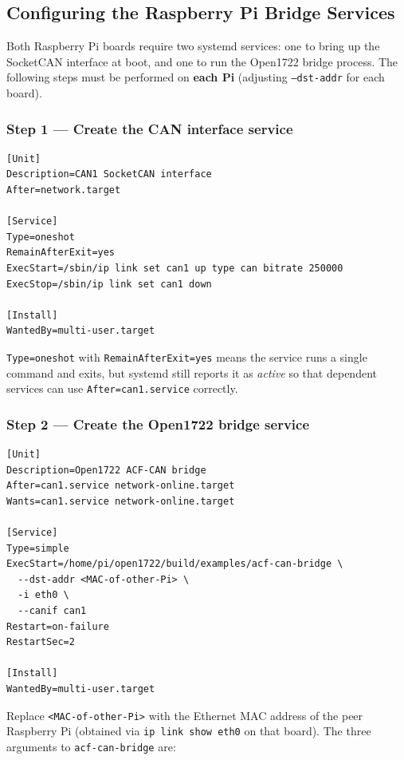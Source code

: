\documentclass[11pt,a4paper]{article}
\begin{document}
\subsection{Configuring the Raspberry Pi Bridge Services}
\label{sec:rpi_setup}

Both Raspberry Pi boards require two systemd services: one to bring up the SocketCAN
interface at boot, and one to run the Open1722 bridge process.  The following steps
must be performed on \textbf{each Pi} (adjusting \texttt{--dst-addr} for each board).

\subsubsection*{Step 1 --- Create the CAN interface service}

\begin{lstlisting}[caption={/etc/systemd/system/can1.service}]
[Unit]
Description=CAN1 SocketCAN interface
After=network.target

[Service]
Type=oneshot
RemainAfterExit=yes
ExecStart=/sbin/ip link set can1 up type can bitrate 250000
ExecStop=/sbin/ip link set can1 down

[Install]
WantedBy=multi-user.target
\end{lstlisting}

\texttt{Type=oneshot} with \texttt{RemainAfterExit=yes} means the service runs a
single command and exits, but systemd still reports it as \emph{active} so that
dependent services can use \texttt{After=can1.service} correctly.

\subsubsection*{Step 2 --- Create the Open1722 bridge service}

\begin{lstlisting}[caption={/etc/systemd/system/acf-can-bridge.service}]
[Unit]
Description=Open1722 ACF-CAN bridge
After=can1.service network-online.target
Wants=can1.service network-online.target

[Service]
Type=simple
ExecStart=/home/pi/open1722/build/examples/acf-can-bridge \
  --dst-addr <MAC-of-other-Pi> \
  -i eth0 \
  --canif can1
Restart=on-failure
RestartSec=2

[Install]
WantedBy=multi-user.target
\end{lstlisting}

Replace \texttt{<MAC-of-other-Pi>} with the Ethernet MAC address of the peer
Raspberry Pi (obtained via \texttt{ip link show eth0} on that board).
The three arguments to \texttt{acf-can-bridge} are:
\end{document}
